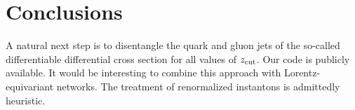 \section{Conclusions}\label{sec:conclusions}

A natural next step is to disentangle the quark and gluon jets of the
so-called differentiable differential cross section for all values of
$z_{\rm cut}$. Our code is publicly available. It would be interesting
to combine this approach with Lorentz-equivariant networks. The
treatment of renormalized instantons is admittedly heuristic.


